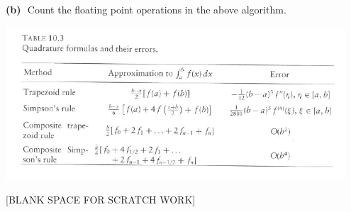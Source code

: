 \documentclass[11pt]{amsart}
\newcommand{\epart}[1]{\medskip\noindent\textbf{(#1)}\,\, }
\newcommand{\pts}[1]{}
\begin{document}
%

\epart{b} \pts{5}  Count the floating point operations in the above algorithm.
\vspace{2.0in}




\newpage
\begin{center}
\includegraphics[width=0.95\textwidth]{figs/inttable}
\bigskip


[BLANK SPACE FOR SCRATCH WORK]
\end{center}
\thispagestyle{empty}
\vfill
\end{document}
